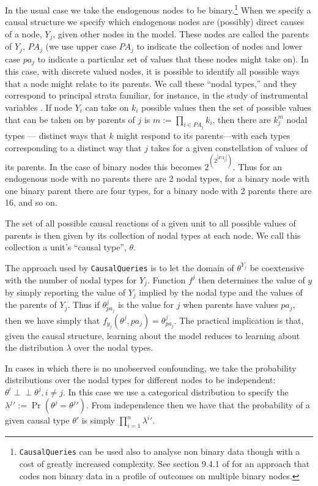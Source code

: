 \documentclass[
  article]{jss}
\begin{document}
In the usual case we take the endogenous nodes to be binary.\footnote{\texttt{CausalQueries}
  can be used also to analyse non binary data though with a cost of
  greatly increased complexity. See section 9.4.1 of \citet{ii2023} for
  an approach that codes non binary data in a profile of outcomes on
  multiple binary nodes.} When we specify a causal structure we specify
which endogenous nodes are (possibly) direct causes of a node, \(Y_j\),
given other nodes in the model. These nodes are called the parents of
\(Y_j\), \(PA_j\) (we use upper case \(PA_j\) to indicate the collection
of nodes and lower case \(pa_j\) to indicate a particular set of values
that these nodes might take on). In this case, with discrete valued
nodes, it is possible to identify all possible ways that a node might
relate to its parents. We call these ``nodal types,'' and they
correspond to principal strata familiar, for instance, in the study of
instrumental variables \citep{frangakis2002principal}. If node \(Y_i\)
can take on \(k_i\) possible values then the set of possible values that
can be taken on by parents of \(j\) is \(m :=\prod_{i\in PA_j}k_i\),
then there are \(k_j^{m}\) nodal types --- distinct ways that \(k\)
might respond to its parents---with each types corresponding to a
distinct way that \(j\) takes for a given constellation of values of its
parents. In the case of binary nodes this becomes
\(2^{\left(2^{|PA_j|}\right)}\). Thus for an endogenous node with no
parents there are 2 nodal types, for a binary node with one binary
parent there are four types, for a binary node with 2 parents there are
16, and so on.

The set of all possible causal reactions of a given unit to all possible
values of parents is then given by its collection of nodal types at each
node. We call this collection a unit's ``causal type'', \(\theta\).

The approach used by \texttt{CausalQueries} is to let the domain of
\(\theta^{Y_j}\) be coextensive with the number of nodal types for
\(Y_j\). Function \(f^j\) then determines the value of \(y\) by simply
reporting the value of \(Y_j\) implied by the nodal type and the values
of the parents of \(Y_j\). Thus if \(\theta^j_{pa_j}\) is the value for
\(j\) when parents have values \(pa_j\), then we have simply that
\(f_{y_j}(\theta^{j}, pa_j) = \theta^j_{pa_j}\). The practical
implication is that, given the causal structure, learning about the
model reduces to learning about the distribution \(\lambda\) over the
nodal types.

In cases in which there is no unobserved confounding, we take the
probability distributions over the nodal types for different nodes to be
independent: \(\theta^i \perp\!\!\! \perp \theta^j, i\neq j\). In this
case we use a categorical distribution to specify the
\({\lambda^j}' := \Pr(\theta^j = {\theta^j}')\). From independence then
we have that the probability of a given causal type \(\theta'\) is
simply \(\prod_{i=1}^n {\lambda^i}'\).
\end{document}
